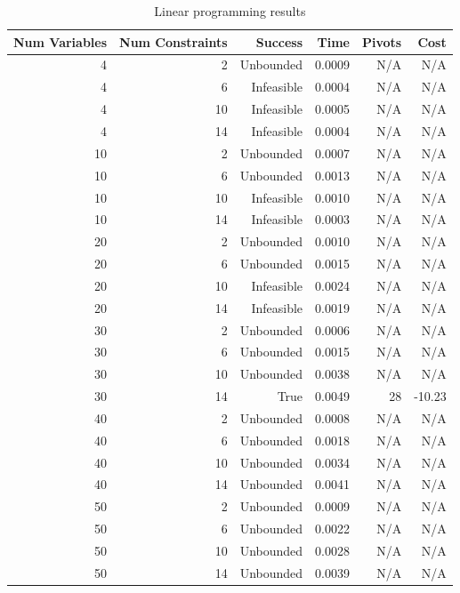 \begin{table}[ht]
    \centering
    \begin{tabular}{rrrrrr}
        \toprule
        Num Variables & Num Constraints & Success & Time & Pivots & Cost \\
        \midrule
        4 & 2 & Unbounded & 0.0009 & N/A & N/A \\
		4 & 6 & Infeasible & 0.0004 & N/A & N/A \\
		4 & 10 & Infeasible & 0.0005 & N/A & N/A \\
		4 & 14 & Infeasible & 0.0004 & N/A & N/A \\
		10 & 2 & Unbounded & 0.0007 & N/A & N/A \\
		10 & 6 & Unbounded & 0.0013 & N/A & N/A \\
		10 & 10 & Infeasible & 0.0010 & N/A & N/A \\
		10 & 14 & Infeasible & 0.0003 & N/A & N/A \\
		20 & 2 & Unbounded & 0.0010 & N/A & N/A \\
		20 & 6 & Unbounded & 0.0015 & N/A & N/A \\
		20 & 10 & Infeasible & 0.0024 & N/A & N/A \\
		20 & 14 & Infeasible & 0.0019 & N/A & N/A \\
		30 & 2 & Unbounded & 0.0006 & N/A & N/A \\
		30 & 6 & Unbounded & 0.0015 & N/A & N/A \\
		30 & 10 & Unbounded & 0.0038 & N/A & N/A \\
		30 & 14 & True & 0.0049 & 28 & -10.23 \\
		40 & 2 & Unbounded & 0.0008 & N/A & N/A \\
		40 & 6 & Unbounded & 0.0018 & N/A & N/A \\
		40 & 10 & Unbounded & 0.0034 & N/A & N/A \\
		40 & 14 & Unbounded & 0.0041 & N/A & N/A \\
		50 & 2 & Unbounded & 0.0009 & N/A & N/A \\
		50 & 6 & Unbounded & 0.0022 & N/A & N/A \\
		50 & 10 & Unbounded & 0.0028 & N/A & N/A \\
		50 & 14 & Unbounded & 0.0039 & N/A & N/A \\
        \bottomrule
    \end{tabular}
    \caption{Linear programming results}
    \label{tab:lp-results}
\end{table}